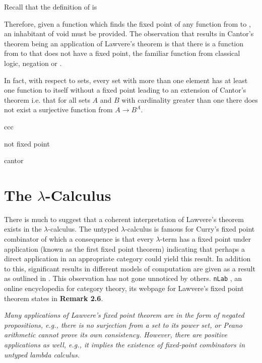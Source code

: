 Recall that the definition of  is

Therefore, given a function which finds the fixed point of any function from
 to , an inhabitant of void must be
provided. The observation that results in Cantor's theorem being an application
of Lawvere's theorem is that there is a function from  to
 that does not have a fixed point, the familiar function from
classical logic, negation or .


In fact, with respect to sets, every set with more than one element has at least
one function to itself without a fixed point leading to an extension of Cantor's
theorem i.e. that for all sets $A$ and $B$ with cardinality greater than one
there does not exist a surjective function from $A \rightarrow B^A$.

ccc

not fixed point

cantor
\section{The $\lambda$-Calculus}
There is much to suggest that a coherent interpretation of Lawvere's theorem
exists in the $\lambda$-calculus. The untyped $\lambda$-calculus is famous for
Curry's fixed point combinator  of which a consequence is that
every $\lambda$-term has a fixed point under application (known as the first
fixed point theorem) indicating that perhaps a direct
application in an appropriate category could yield this result. In addition to
this, significant results in different models of computation are given as a
result as outlined in . This observation has not
gone unnoticed by others. \verb|nLab| , an online encyclopedia
for category theory, its webpage for Lawvere's fixed point
theorem states in \textbf{Remark 2.6}.

\begin{displayquote}
\textit{Many applications of Lawvere’s fixed point theorem are in the form of negated
propositions, e.g., there is no surjection from a set to its power set, or
Peano arithmetic cannot prove its own consistency. However, there are positive
applications as well, e.g., it implies the existence of fixed-point combinators
in untyped lambda calculus.}
\end{displayquote}

